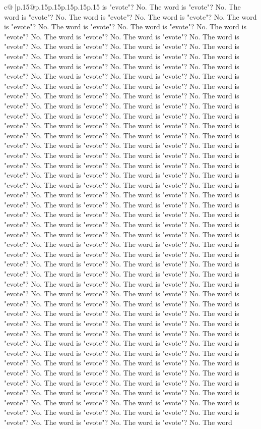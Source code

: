\documentclass{article}
\begin{document}
{\begin{supertabular}{c@{$\;$}|p{.15\linewidth}@{}p{.15\linewidth}p{.15\linewidth}p{.15\linewidth}p{.15\linewidth}p{.15\linewidth}}
{{{is "evote"? No. The word is "evote"? No. The word is "evote"? No. The word is "evote"? No. The word is "evote"? No. The word is "evote"? No. The word is "evote"? No. The word is "evote"? No. The word is "evote"? No. The word is "evote"? No. The word is "evote"? No. The word is "evote"? No. The word is "evote"? No. The word is "evote"? No. The word is "evote"? No. The word is "evote"? No. The word is "evote"? No. The word is "evote"? No. The word is "evote"? No. The word is "evote"? No. The word is "evote"? No. The word is "evote"? No. The word is "evote"? No. The word is "evote"? No. The word is "evote"? No. The word is "evote"? No. The word is "evote"? No. The word is "evote"? No. The word is "evote"? No. The word is "evote"? No. The word is "evote"? No. The word is "evote"? No. The word is "evote"? No. The word is "evote"? No. The word is "evote"? No. The word is "evote"? No. The word is "evote"? No. The word is "evote"? No. The word is "evote"? No. The word is "evote"? No. The word is "evote"? No. The word is "evote"? No. The word is "evote"? No. The word is "evote"? No. The word is "evote"? No. The word is "evote"? No. The word is "evote"? No. The word is "evote"? No. The word is "evote"? No. The word is "evote"? No. The word is "evote"? No. The word is "evote"? No. The word is "evote"? No. The word is "evote"? No. The word is "evote"? No. The word is "evote"? No. The word is "evote"? No. The word is "evote"? No. The word is "evote"? No. The word is "evote"? No. The word is "evote"? No. The word is "evote"? No. The word is "evote"? No. The word is "evote"? No. The word is "evote"? No. The word is "evote"? No. The word is "evote"? No. The word is "evote"? No. The word is "evote"? No. The word is "evote"? No. The word is "evote"? No. The word is "evote"? No. The word is "evote"? No. The word is "evote"? No. The word is "evote"? No. The word is "evote"? No. The word is "evote"? No. The word is "evote"? No. The word is "evote"? No. The word is "evote"? No. The word is "evote"? No. The word is "evote"? No. The word is "evote"? No. The word is "evote"? No. The word is "evote"? No. The word is "evote"? No. The word is "evote"? No. The word is "evote"? No. The word is "evote"? No. The word is "evote"? No. The word is "evote"? No. The word is "evote"? No. The word is "evote"? No. The word is "evote"? No. The word is "evote"? No. The word is "evote"? No. The word is "evote"? No. The word is "evote"? No. The word is "evote"? No. The word is "evote"? No. The word is "evote"? No. The word is "evote"? No. The word is "evote"? No. The word is "evote"? No. The word is "evote"? No. The word is "evote"? No. The word is "evote"? No. The word is "evote"? No. The word is "evote"? No. The word is "evote"? No. The word is "evote"? No. The word is "evote"? No. The word is "evote"? No. The word is "evote"? No. The word is "evote"? No. The word is "evote"? No. The word is "evote"? No. The word is "evote"? No. The word is "evote"? No. The word is "evote"? No. The word is "evote"? No. The word is "evote"? No. The word is "evote"? No. The word is "evote"? No. The word is "evote"? No. The word is "evote"? No. The word is "evote"? No. The word is "evote"? No. The word }}}
\end{supertabular}}
\end{document}
